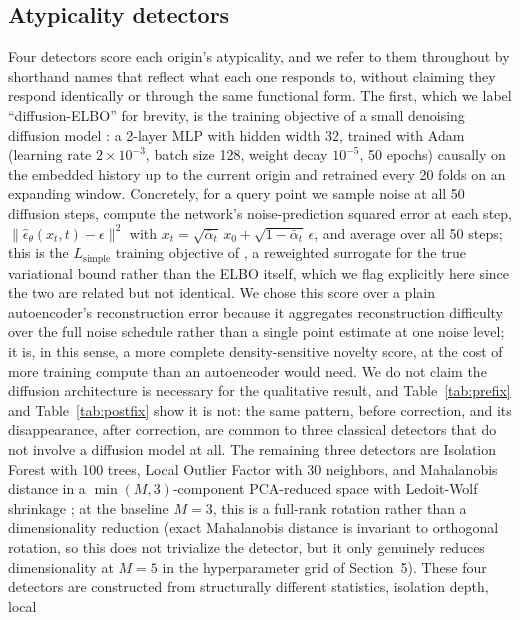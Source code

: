 \documentclass[preprint,12pt]{elsarticle}
\begin{document}
\subsection{Atypicality detectors}
Four detectors score each origin's atypicality, and we refer to them throughout by shorthand
names that reflect what each one responds to, without claiming they respond identically or
through the same functional form. The first, which we label ``diffusion-ELBO'' for brevity, is
the training objective of a small denoising diffusion model \citep{ho2020}: a 2-layer MLP with
hidden width 32, trained with Adam (learning rate $2\times10^{-3}$, batch size 128, weight decay
$10^{-5}$, 50 epochs) causally on the embedded history up to the current origin and retrained
every 20 folds on an expanding window. Concretely, for a query point we sample noise at all 50
diffusion steps, compute the network's noise-prediction squared error at each step, $\lVert
\hat{\epsilon}_\theta(x_t,t) - \epsilon \rVert^2$ with $x_t = \sqrt{\bar\alpha_t}\,x_0 +
\sqrt{1-\bar\alpha_t}\,\epsilon$, and average over all 50 steps; this is the $L_{\text{simple}}$
training objective of \citet{ho2020}, a reweighted surrogate for the true variational bound
rather than the ELBO itself, which we flag explicitly here since the two are related but not
identical. We chose this score over a plain autoencoder's reconstruction error because it
aggregates reconstruction difficulty over the full noise schedule rather than a single point
estimate at one noise level; it is, in this sense, a more complete density-sensitive novelty
score, at the cost of more training compute than an autoencoder would need. We do not claim the
diffusion architecture is necessary for the qualitative result, and Table~\ref{tab:prefix} and
Table~\ref{tab:postfix} show it is not: the same pattern, before correction, and its
disappearance, after correction, are common to three classical detectors that do not involve a
diffusion model at all. The remaining three detectors are Isolation Forest \citep{liu2008} with
100 trees, Local Outlier Factor \citep{breunig2000} with 30 neighbors, and Mahalanobis distance
in a $\min(M,3)$-component PCA-reduced space with Ledoit-Wolf shrinkage \citep{ledoit2004}; at
the baseline $M=3$, this is a full-rank rotation rather than a dimensionality reduction (exact
Mahalanobis distance is invariant to orthogonal rotation, so this does not trivialize the
detector, but it only genuinely reduces dimensionality at $M=5$ in the hyperparameter grid of
Section~5). These four
detectors are constructed from structurally different statistics, isolation depth, local
\end{document}
